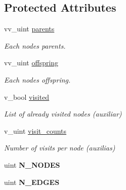 \subsection*{Protected Attributes}
\begin{DoxyCompactItemize}
\item 
vv\+\_\+uint \hyperlink{classTree_a4d26e079c9d0b250a4bda27de8ad223c}{parents}\hypertarget{classTree_a4d26e079c9d0b250a4bda27de8ad223c}{}\label{classTree_a4d26e079c9d0b250a4bda27de8ad223c}

\begin{DoxyCompactList}\small\item\em Each nodes\textquotesingle{} parents. \end{DoxyCompactList}\item 
vv\+\_\+uint \hyperlink{classTree_ade5fd3ba5b6480c4edf8590eb0e41e34}{offspring}\hypertarget{classTree_ade5fd3ba5b6480c4edf8590eb0e41e34}{}\label{classTree_ade5fd3ba5b6480c4edf8590eb0e41e34}

\begin{DoxyCompactList}\small\item\em Each nodes\textquotesingle{} offspring. \end{DoxyCompactList}\item 
v\+\_\+bool \hyperlink{classTree_a45813764070bd88238a3372c16b423fa}{visited}\hypertarget{classTree_a45813764070bd88238a3372c16b423fa}{}\label{classTree_a45813764070bd88238a3372c16b423fa}

\begin{DoxyCompactList}\small\item\em List of already visited nodes (auxiliar) \end{DoxyCompactList}\item 
v\+\_\+uint \hyperlink{classTree_ac504d0c090c1f76363fc00cff2de0e7f}{visit\+\_\+counts}\hypertarget{classTree_ac504d0c090c1f76363fc00cff2de0e7f}{}\label{classTree_ac504d0c090c1f76363fc00cff2de0e7f}

\begin{DoxyCompactList}\small\item\em Number of visits per node (auxilias) \end{DoxyCompactList}\item 
uint {\bfseries N\+\_\+\+N\+O\+D\+ES}\hypertarget{classTree_a41b7a5ddd47b82688c099ee47561eb4f}{}\label{classTree_a41b7a5ddd47b82688c099ee47561eb4f}

\item 
uint {\bfseries N\+\_\+\+E\+D\+G\+ES}\hypertarget{classTree_a123cdf871af449443aa8b7c05029d72a}{}\label{classTree_a123cdf871af449443aa8b7c05029d72a}


\end{DoxyCompactItemize}
